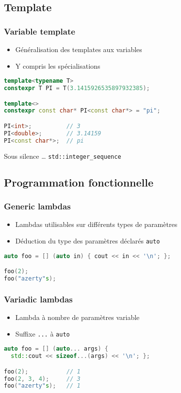 \documentclass[C++.tex]{subfiles}
\begin{document}
\subsection*{Template}
\begin{frame}[fragile]
	\frametitle{Variable template}
	\begin{itemize}
		\item Généralisation des templates aux variables
		\item Y compris les spécialisations
	\end{itemize}

	\begin{lstlisting}[language=C++]
template<typename T>
constexpr T PI = T(3.1415926535897932385);

template<>
constexpr const char* PI<const char*> = "pi";

PI<int>;          // 3
PI<double>;       // 3.14159
PI<const char*>;  // pi\end{lstlisting}

	\begin{block}{Sous silence \ldots}
		\lstinline|std::integer_sequence|
	\end{block}
\end{frame}

\subsection*{Programmation fonctionnelle}
\begin{frame}[fragile]
	\frametitle{Generic lambdas}
	\begin{itemize}
		\item Lambdas utilisables sur différents types de paramètres
		\item Déduction du type des paramètres déclarés \lstinline|auto|
	\end{itemize}

	\begin{lstlisting}[language=C++]
auto foo = [] (auto in) { cout << in << '\n'; };

foo(2);
foo("azerty"s);\end{lstlisting}
\end{frame}

\begin{frame}[fragile]
	\frametitle{Variadic lambdas}
	\begin{itemize}
		\item Lambda à nombre de paramètres variable
		\item Suffixe \lstinline|...| à \lstinline|auto|
	\end{itemize}

	\begin{lstlisting}[language=C++]
auto foo = [] (auto... args) { 
  std::cout << sizeof...(args) << '\n'; };

foo(2);           // 1
foo(2, 3, 4);     // 3
foo("azerty"s);   // 1\end{lstlisting}
\end{frame}
\end{document}

